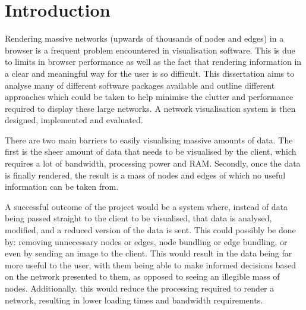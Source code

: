 \documentclass[../dissertation.tex]{subfiles}
\begin{document}
\chapter{Introduction}

Rendering massive networks (upwards of thousands of nodes and edges) in a browser is a frequent problem encountered in visualisation software. This is due to limits in browser performance as well as the fact that rendering information in a clear and meaningful way for the user is so difficult. This dissertation aims to analyse many of different software packages available and outline different approaches which could be taken to help minimise the clutter and performance required to display these large networks. A network visualisation system is then designed, implemented and evaluated.

There are two main barriers to easily visualising massive amounts of data. The first is the sheer amount of data that needs to be visualised by the client, which requires a lot of bandwidth, processing power and RAM. Secondly, once the data is finally rendered, the result is a mass of nodes and edges of which no useful information can be taken from. 

A successful outcome of the project would be a system where, instead of data being passed straight to the client to be visualised, that data is analysed, modified, and a reduced version of the data is sent. This could possibly be done by: removing unnecessary nodes or edges, node bundling or edge bundling, or even by sending an image to the client. This would result in the data being far more useful to the user, with them being able to make informed decisions based on the network presented to them, as opposed to seeing an illegible mass of nodes. Additionally. this would reduce the processing required to render a network, resulting in lower loading times and bandwidth requirements.
\end{document}
